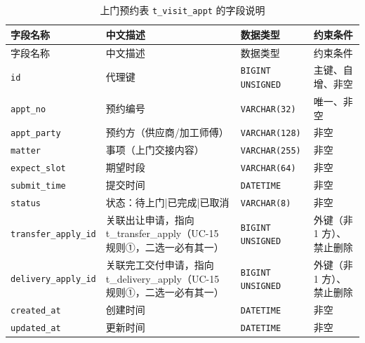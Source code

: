 \documentclass[12pt, a4paper]{ctexart}
\newcommand{\code}[1]{\texttt{\small #1}}
\begin{document}
\begin{longtable}{@{}p{3.1cm} p{4.5cm} p{2.4cm} p{4.5cm}@{}}
\caption{上门预约表 \code{t\_visit\_appt} 的字段说明}\label{tab:f-t-visit-appt}\\
\toprule
字段名称 & 中文描述 & 数据类型 & 约束条件 \\
\midrule
\endfirsthead
\toprule
字段名称 & 中文描述 & 数据类型 & 约束条件 \\
\midrule
\endhead
\bottomrule
\endlastfoot
\code{id} & 代理键 & \code{BIGINT UNSIGNED} & 主键、自增、非空 \\
\code{appt\_no} & 预约编号 & \code{VARCHAR(32)} & 唯一、非空 \\
\code{appt\_party} & 预约方（供应商/加工师傅） & \code{VARCHAR(128)} & 非空 \\
\code{matter} & 事项（上门交接内容） & \code{VARCHAR(255)} & 非空 \\
\code{expect\_slot} & 期望时段 & \code{VARCHAR(64)} & 非空 \\
\code{submit\_time} & 提交时间 & \code{DATETIME} & 非空 \\
\code{status} & 状态：待上门|已完成|已取消 & \code{VARCHAR(8)} & 非空 \\
\code{transfer\_apply\_id} & 关联出让申请，指向 t\_transfer\_apply（UC-15 规则①，二选一必有其一） & \code{BIGINT UNSIGNED} & 外键（非 1 方）、禁止删除 \\
\code{delivery\_apply\_id} & 关联完工交付申请，指向 t\_delivery\_apply（UC-15 规则①，二选一必有其一） & \code{BIGINT UNSIGNED} & 外键（非 1 方）、禁止删除 \\
\code{created\_at} & 创建时间 & \code{DATETIME} & 非空 \\
\code{updated\_at} & 更新时间 & \code{DATETIME} & 非空 \\
\end{longtable}
\end{document}
